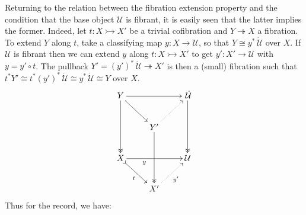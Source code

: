 \documentclass[12pt]{article}
\newcommand{\ra}{\ensuremath{\rightarrow}}
\newcommand{\cof}{\ensuremath{\rightarrowtail}}
\newcommand{\fib}{\ensuremath{\twoheadrightarrow}}
\newcommand{\II}{\ensuremath{\mathbb{I}}}
\newcommand{\U}{\ensuremath{\mathcal{U}}}
\newcommand{\UU}{\ensuremath{\,\dot{\mathcal{U}}}}
\newtheorem{proposition}[theorem]{Proposition}
\newtheorem{lemma}[theorem]{Lemma}
\theoremstyle{remark}
\theoremstyle{definition}
\begin{document}
%
%
%
%
%

Returning to the relation between the fibration extension property and the condition that the base object $\U$ is fibrant, it is easily seen that the latter implies the former.  Indeed, let $t : X\cof X'$ be a trivial cofibration and $Y \fib X$ a fibration.  To extend $Y$ along $t$, take a classifying map $y : X \ra \U$, so that $Y \cong y^*\UU$ over $X$. If $\U$ is fibrant then we can extend $y$ along $t : X\cof X'$ to get $y' : X' \ra \U$ with $y = y'\circ t$.  The pullback $Y' = (y')^*\UU \fib X'$ is then a (small) fibration such that $t^*Y' \cong t^*(y')^*\UU\cong y^*\UU \cong Y$ over $X$.  
\[
\xymatrix{
Y \ar@{->>}[dd] \ar[rd] \ar[rr] && \UU \ar@{->>}[dd] \\
& Y' \ar@{->>}[dd] \ar@{..>}[ru] & \\
X  \ar@{>->}[rd]_t \ar[rr]_<<<<<<<<{y}  && \U  \\
& X' \ar@{..>}[ru]_{y'} &
}
\]
Thus for the record, we have:
\end{document}

